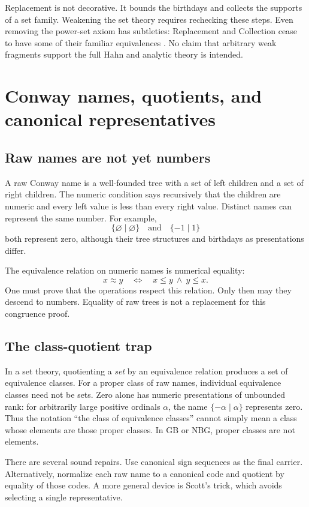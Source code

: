\documentclass[11pt,letterpaper]{article}
\numberwithin{equation}{section}
\theoremstyle{definition}
\theoremstyle{remark}
\begin{document}
Replacement is not decorative. It bounds the birthdays and collects the supports of a set family. Weakening the set theory requires rechecking these steps. Even removing the power-set axiom has subtleties: Replacement and Collection cease to have some of their familiar equivalences \cite{GHJ}. No claim that arbitrary weak fragments support the full Hahn and analytic theory is intended.

\section{Conway names, quotients, and canonical representatives}\label{sec:quotients}
\subsection{Raw names are not yet numbers}
A raw Conway name is a well-founded tree with a set of left children and a set of right children. The numeric condition says recursively that the children are numeric and every left value is less than every right value. Distinct names can represent the same number. For example,
\[
 \{\varnothing\mid\varnothing\}\quad\text{and}\quad\{-1\mid1\}
\]
both represent zero, although their tree structures and birthdays as presentations differ.

The equivalence relation on numeric names is numerical equality:
\[
 x\approx y\quad\Longleftrightarrow\quad x\le y\ \land\ y\le x.
\]
One must prove that the operations respect this relation. Only then may they descend to numbers. Equality of raw trees is not a replacement for this congruence proof.

\subsection{The class-quotient trap}
In a set theory, quotienting a \emph{set} by an equivalence relation produces a set of equivalence classes. For a proper class of raw names, individual equivalence classes need not be sets. Zero alone has numeric presentations of unbounded rank: for arbitrarily large positive ordinals $\alpha$, the name $\{-\alpha\mid\alpha\}$ represents zero. Thus the notation ``the class of equivalence classes'' cannot simply mean a class whose elements are those proper classes. In GB or NBG, proper classes are not elements.

There are several sound repairs. Use canonical sign sequences as the final carrier. Alternatively, normalize each raw name to a canonical code and quotient by equality of those codes. A more general device is Scott's trick, which avoids selecting a single representative.
\end{document}
